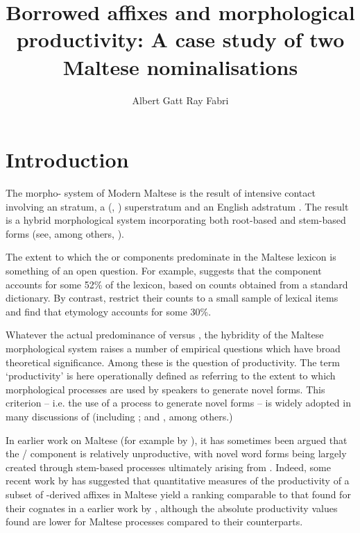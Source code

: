 \documentclass[output=paper]{LSP/langsci}
\author{Albert Gatt\affiliation{Institute of Linguistics and Language Technology, University of Malta} 
 \lastand Ray Fabri\affiliation{Institute of Linguistics and Language Technology, University of Malta} 
}
\title{Borrowed affixes and morphological productivity: A case study of two Maltese nominalisations}
\begin{document}
\section{Introduction}\label{sec:intro}
The morpho- system of Modern Maltese is the result of intensive contact involving an  stratum, a  (, ) superstratum and an English adstratum \citep{Brincat2011, Mifsud1995productivity}. The result is a hybrid morphological system incorporating both root-based and stem-based forms (see, among others, \citealt{Drewes1994,Mifsud1995productivity,Fabri2010,Spagnol2013}). 

The extent to which the  or  components predominate in the Maltese lexicon is something of an open question. For example, \citet{Brincat2011} suggests that the  component accounts for some 52\% of the lexicon, based on counts obtained from a standard dictionary. By contrast, \citet{ComrieSpagnol2016} restrict their counts to a small sample of lexical items and find that  etymology accounts for some 30\%.

Whatever the actual predominance of  versus , the hybridity of the Maltese morphological system raises a number of empirical questions which have broad theoretical significance. Among these is the question of productivity. The term `productivity' is here operationally defined as referring to the extent to which  morphological processes are used by speakers to generate novel forms. This criterion -- i.e. the use of a process to generate novel forms -- is widely adopted in many discussions of  (including \citealt{Aronoff1978,Cutler1980,Aronoff1998,Bauer2001,Dressler2003}; and \citealt{Plag2004}, among others.) 

In earlier work on Maltese (for example by \citealt{Mifsud1995productivity,Hoberman2003}), it has sometimes been argued that the /  component is relatively unproductive, with novel word forms being largely created through stem-based processes ultimately arising from . Indeed, some recent work by \citet{Saade2016} has suggested that quantitative measures of the productivity of a subset of -derived  affixes in Maltese yield a ranking comparable to that found for their  cognates in a earlier work by \citet{GaetaRicca2006}, although the absolute productivity values found are lower for Maltese processes compared to their  counterparts.
\end{document}
